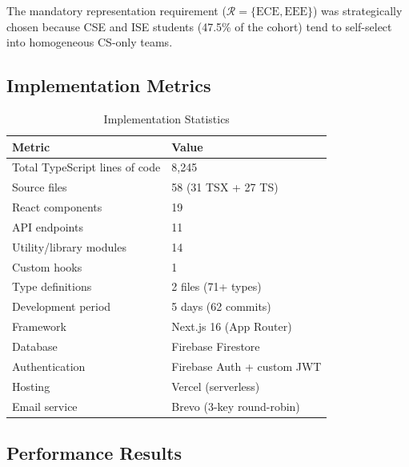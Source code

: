 \documentclass[12pt,a4paper]{article}
\begin{document}
The mandatory representation requirement ($\mathcal{R} = \{\text{ECE}, \text{EEE}\}$) was strategically chosen because CSE and ISE students (47.5\% of the cohort) tend to self-select into homogeneous CS-only teams.

\subsection{Implementation Metrics}

\begin{table}[H]
\centering
\caption{Implementation Statistics}
\begin{tabular}{@{}ll@{}}
\toprule
\textbf{Metric} & \textbf{Value} \\
\midrule
Total TypeScript lines of code & 8,245 \\
Source files & 58 (31 TSX + 27 TS) \\
React components & 19 \\
API endpoints & 11 \\
Utility/library modules & 14 \\
Custom hooks & 1 \\
Type definitions & 2 files (71+ types) \\
Development period & 5 days (62 commits) \\
Framework & Next.js 16 (App Router) \\
Database & Firebase Firestore \\
Authentication & Firebase Auth + custom JWT \\
Hosting & Vercel (serverless) \\
Email service & Brevo (3-key round-robin) \\
\bottomrule
\end{tabular}
\end{table}

\subsection{Performance Results}
\end{document}
